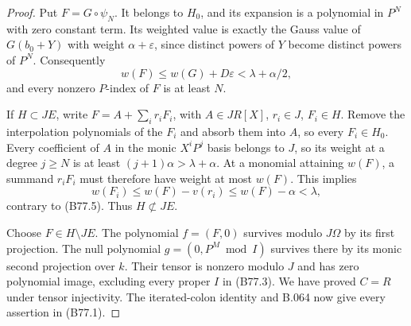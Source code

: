 \begin{proof}
Put $F=G\circ\psi_N$. It belongs to $H_0$, and its expansion is a
polynomial in $P^N$ with zero constant term. Its weighted value is
exactly the Gauss value of $G(b_0+Y)$ with weight
$\alpha+\varepsilon$, since distinct powers of $Y$ become distinct
powers of $P^N$. Consequently
\[
                  w(F)\le w(G)+D\varepsilon
                                  <\lambda+\alpha/2,      \tag{B77.7}
\]
and every nonzero $P$-index of $F$ is at least $N$.

If $H\subset JE$, write $F=A+\sum_i r_iF_i$, with
$A\in JR[X]$, $r_i\in J$, $F_i\in H$.
Remove the interpolation polynomials of the $F_i$ and absorb them
into $A$, so every $F_i\in H_0$.
Every coefficient of $A$ in the monic $X^iP^j$ basis belongs to $J$,
so its weight at a degree $j\ge N$ is at least
$(j+1)\alpha>\lambda+\alpha$.
At a monomial attaining $w(F)$, a summand $r_iF_i$ must therefore
have weight at most $w(F)$. This implies
\[
                   w(F_i)\le w(F)-v(r_i)
                         \le w(F)-\alpha<\lambda,
\]
contrary to (B77.5). Thus $H\not\subset JE$.

Choose $F\in H\setminus JE$. The polynomial $f=(F,0)$ survives modulo
$J\Omega$ by its first projection. The null polynomial
$g=(0,P^M\bmod I)$ survives there by its monic second projection over
$k$. Their tensor is nonzero modulo $J$ and has zero polynomial image,
excluding every proper $I$ in (B77.3).
We have proved $C=R$ under tensor injectivity. The iterated-colon
identity and B.064 now give every assertion in (B77.1).
\end{proof}
